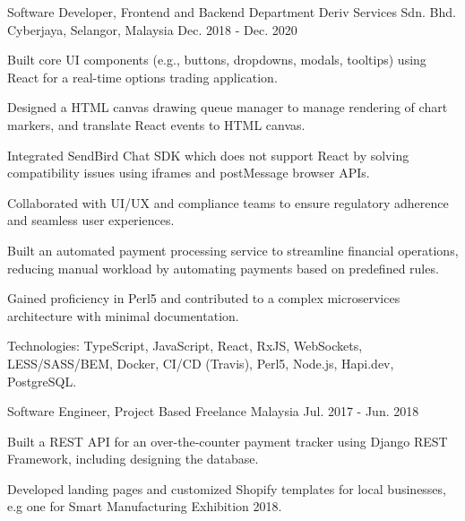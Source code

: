 \begin{cventries}
  \cventry
    {Software Developer, Frontend and Backend Department} %
    {Deriv Services Sdn. Bhd.} %
    {Cyberjaya, Selangor, Malaysia} %
    {Dec. 2018 - Dec. 2020} %
    {
      \begin{cvitems} %
        \item {Built core UI components (e.g., buttons, dropdowns, modals, tooltips) using React for a real-time options trading application.}
        \item {Designed a HTML canvas drawing queue manager to manage rendering of chart markers, and translate React events to HTML canvas.}
        \item {Integrated SendBird Chat SDK which does not support React by solving compatibility issues using iframes and postMessage browser APIs.}
        \item {Collaborated with UI/UX and compliance teams to ensure regulatory adherence and seamless user experiences.}
        \item {Built an automated payment processing service to streamline financial operations, reducing manual workload by automating payments based on predefined rules.}
        \item {Gained proficiency in Perl5 and contributed to a complex microservices architecture with minimal documentation.}
        \item {Technologies: TypeScript, JavaScript, React, RxJS, WebSockets, LESS/SASS/BEM, Docker, CI/CD (Travis), Perl5, Node.js, Hapi.dev, PostgreSQL.}
      \end{cvitems}
    }

  \cventry
    {Software Engineer, Project Based} %
    {Freelance} %
    {Malaysia} %
    {Jul. 2017 - Jun. 2018} %
    {
      \begin{cvitems} %
        \item {Built a REST API for an over-the-counter payment tracker using Django REST Framework, including designing the database.}
        \item {Developed landing pages and customized Shopify templates for local businesses, e.g one for Smart Manufacturing Exhibition 2018.}
      \end{cvitems}
    }

\end{cventries}
